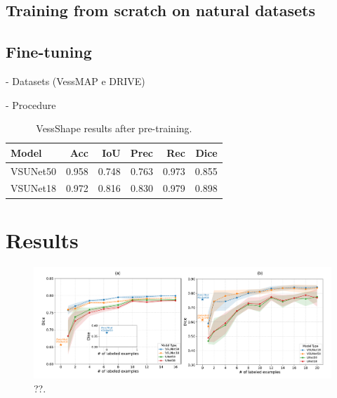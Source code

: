 \documentclass[%
reprint,
nofootinbib,
 amsmath,amssymb,
aps,
superscriptaddress,
showkeys,
longbibliography
]{revtex4-1}
\begin{document}
\subsection{Training from scratch on natural datasets}

\subsection{Fine-tuning}

- Datasets (VessMAP e DRIVE)

- Procedure

\begin{table}[t]
    \caption{VessShape results after pre-training.}
    \label{tab:vs_vessshape_results}
    \centering
    \begingroup
    \small
    \setlength{\tabcolsep}{3pt}
    \renewcommand{\arraystretch}{1.15}
    \begin{tabularx}{\columnwidth}{l r r r r r}
        \hline
        	\textbf{Model} & \textbf{Acc} & \textbf{IoU} & \textbf{Prec} & \textbf{Rec} & \textbf{Dice} \\
        \hline
        VSUNet50 & 0.958 & 0.748 & 0.763 & 0.973 & 0.855 \\
        VSUNet18 & 0.972 & 0.816 & 0.830 & 0.979 & 0.898 \\
        \hline
    \end{tabularx}
    \endgroup
\end{table}

\section{Results}
\label{s:results}

\begin{figure}[tbp]
    \centering
    \includegraphics[width=\textwidth]{figures/results/results_charts.pdf}
    \caption{??.}
    \label{f:results_charts}
\end{figure}
\end{document}
